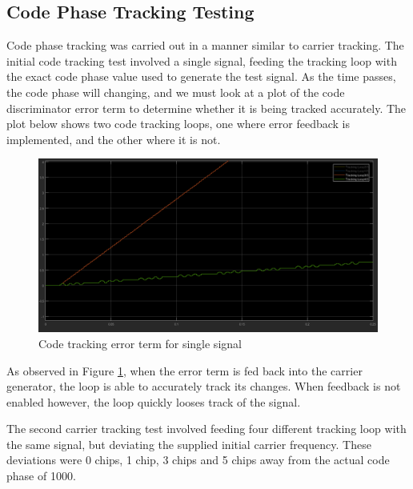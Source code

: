 \documentclass[11pt]{article}
\numberwithin{equation}{subsection}
\begin{document}
	\subsection{Code Phase Tracking Testing}
	
	Code phase tracking was carried out in a manner similar to carrier tracking. The initial code tracking test involved a single signal, feeding the tracking loop with the exact code phase value used to generate the test signal. As the time passes, the code phase will changing, and we must look at a plot of the code discriminator error term to determine whether it is being tracked accurately. The plot below shows two code tracking loops, one where error feedback is implemented, and the other where it is not. 
	
	\begin{figure}
		\centering
		\includegraphics[width=\textwidth]{Code_Tracking_Test_1}
		\caption{Code tracking error term for single signal}
		\label{code1}
	\end{figure}
	
	As observed in Figure \ref{code1}, when the error term is fed back into the carrier generator, the loop is able to accurately track its changes. When feedback is not enabled however, the loop quickly looses track of the signal.
	
	
	The second carrier tracking test involved feeding four different tracking loop with the same signal, but deviating the supplied initial carrier frequency. These deviations were 0 chips, 1 chip, 3 chips and 5 chips away from the actual code phase of 1000.
	
\end{document}
